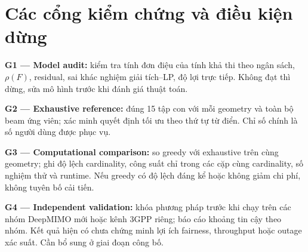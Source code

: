 \documentclass[12pt,onecolumn]{IEEEtran}
\begin{document}
\section{Các cổng kiểm chứng và điều kiện dừng}
\textbf{G1 — Model audit:} kiểm tra tính đơn điệu của tính khả thi theo ngân sách, $\rho(F)$, residual, sai khác nghiệm giải tích–LP, độ lợi trực tiếp. Không đạt thì dừng, sửa mô hình trước khi đánh giá thuật toán.

\textbf{G2 — Exhaustive reference:} đúng 15 tập con với mỗi geometry và toàn bộ beam ứng viên; xác minh quyết định tối ưu theo thứ tự từ điển. Chỉ số chính là số người dùng được phục vụ.

\textbf{G3 — Computational comparison:} so greedy với exhaustive trên cùng geometry; ghi độ lệch cardinality, công suất chỉ trong các cặp cùng cardinality, số nghiệm thử và runtime. Nếu greedy có độ lệch đáng kể hoặc không giảm chi phí, không tuyên bố cải tiến.

\textbf{G4 — Independent validation:} khóa phương pháp trước khi chạy trên các nhóm DeepMIMO mới hoặc kênh 3GPP riêng; báo cáo khoảng tin cậy theo nhóm. Kết quả hiện có chưa chứng minh lợi ích fairness, throughput hoặc outage xác suất. Cần bổ sung ở giai đoạn công bố.
\end{document}
